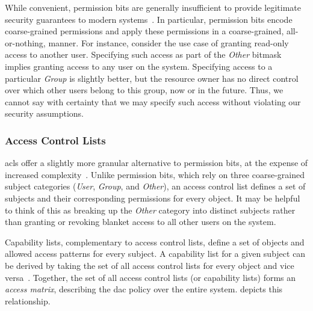 \documentclass[
  fontsize=12pt,
  titlepage=firstiscover,
  paper=letter,
oneside,
  cleardoublepage=plain,
  parskip=half-,
  DIV=10,
  parindent,
  appendixprefix,
  chapterprefix,
  listof=totoc,
]{scrbook}
\begin{document}
While convenient, permission bits are generally insufficient to provide legitimate
security guarantees to modern systems~\cite{van_oorschot2020_tools_jewels,
jaeger2008_os_security}. In particular, permission bits encode coarse-grained permissions
and apply these permissions in a coarse-grained, all-or-nothing, manner. For instance,
consider the use case of granting read-only access to another user. Specifying such access
as part of the \textit{Other} bitmask implies granting access to any user on the system.
Specifying access to a particular \textit{Group} is slightly better, but the resource
owner has no direct control over which other users belong to this group, now or in the
future. Thus, we cannot say with certainty that we may specify such access without
violating our security assumptions.

\subsubsection*{Access Control Lists}

\Glspl{acl} offer a slightly more granular alternative to permission bits,
at the expense of increased complexity~\cite{jaeger2008_os_security,
van_oorschot2020_tools_jewels}. Unlike permission bits, which rely on three coarse-grained
subject categories (\textit{User}, \textit{Group}, and \textit{Other}), an access control
list defines a set of subjects and their corresponding permissions for every object. It
may be helpful to think of this as breaking up the \textit{Other} category into distinct
subjects rather than granting or revoking blanket access to all other users on the system.

Capability lists, complementary to access control lists, define a set of objects and
allowed access patterns for every subject. A capability list for a given subject can be
derived by taking the set of all access control lists for every object and vice
versa~\cite{van_oorschot2020_tools_jewels}. Together, the set of all access control lists
(or capability lists) forms an \textit{access matrix}, describing the \gls{dac} policy over
the entire system.  depicts this relationship.
\end{document}
